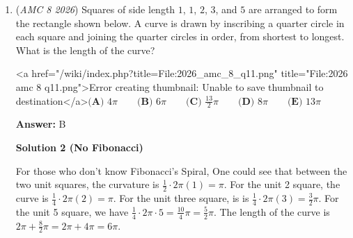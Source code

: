 \begin{enumerate}
 



\textbf{Solution 4}

Firstly, with logic, we can deduce ${Pedro}$ finished first. Therefore, we can use Pedro as a benchmark. In the question, it was given Olympia finished 3 minutes after Pedro. Therefore $O = P - 3$. Next, it is also given Nico finishes 11 minutes after Pedro, so $N = P - 11$. The question also says that Olympia finished 6 minutes before Luke, so $L = P - 9$, because Olympia finished $3$ minutes after Pedro, and Luke finished $6$ minutes after Olympia. Finally, the question states that Olympia finished $2$ minutes ahead of Melina, so using the same logic as Luke's case, $M = P - 5$. 

 Now that we have all times in terms of $P$, we can sort them out by greatest to least. First is obviously Pedro, second is Olympia ($P - 3$), third is Melina ($P - 5$), fourth is Luke ($P - 9$), and lastly we have Nico with ($P - 11$). Therefore, our answer to the problem is $\boxed{\textbf{(A) }\text{Luke}}$.~Ingeniouspeacock36

 


	\item (\textit{AMC 8 2026}) Squares of side length $1$, $1$, $2$, $3$, and $5$ are arranged to form the rectangle shown below. A curve is drawn by inscribing a quarter circle in each square and joining the quarter circles in order, from shortest to longest. What is the length of the curve?


 <a href="/wiki/index.php?title=File:2026\_amc\_8\_q11.png" title="File:2026 amc 8 q11.png">Error creating thumbnail: Unable to save thumbnail to destination</a>$\textbf{(A) } 4\pi\qquad\textbf{(B) } 6\pi\qquad\textbf{(C) } \frac{13}{2}\pi\qquad\textbf{(D) } 8\pi\qquad\textbf{(E) } 13\pi$

 \textbf{Answer: }B



\textbf{Solution 2 (No Fibonacci)}

For those who don't know Fibonacci's Spiral, One could see that between the two unit squares, the curvature is $\frac{1}{2} \cdot 2 \pi (1) = \pi$. For the unit 2 square, the curve is $\frac{1}{4} \cdot 2 \pi (2) = \pi$. For the unit three square, is is $\frac{1}{4} \cdot 2 \pi (3) = \frac{3}{2} \pi$. For the unit 5 square, we have $\frac{1}{4} \cdot 2 \pi \cdot 5 = \frac{10}{4} \pi = \frac{5}{2} \pi$. The length of the curve is $2\pi + \frac{8}{2} \pi = 2\pi + 4\pi = \boxed{6\pi}$.


\end{enumerate}
